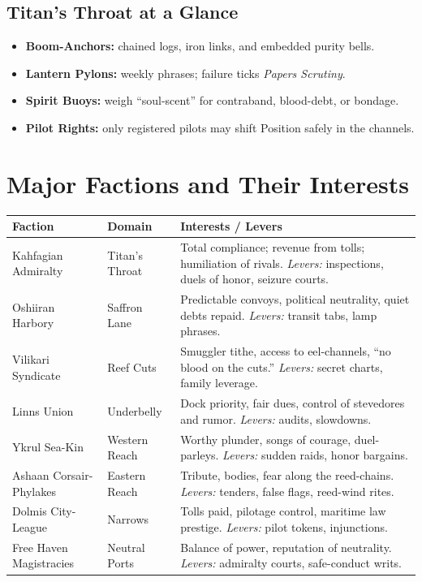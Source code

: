 \documentclass[11pt,oneside]{book}
\begin{document}
\subsection*{Titan's Throat at a Glance}
\begin{itemize}
  \item \textbf{Boom-Anchors:} chained logs, iron links, and embedded purity bells.
  \item \textbf{Lantern Pylons:} weekly phrases; failure ticks \textit{Papers Scrutiny}.
  \item \textbf{Spirit Buoys:} weigh ``soul-scent'' for contraband, blood-debt, or bondage.
  \item \textbf{Pilot Rights:} only registered pilots may shift Position safely in the channels.
\end{itemize}

\section{Major Factions and Their Interests}
\begin{tabularx}{\linewidth}{@{}p{3.3cm} p{2.6cm} X@{}}
\toprule
\textbf{Faction} & \textbf{Domain} & \textbf{Interests / Levers}\\
\midrule
Kahfagian Admiralty & Titan's Throat & Total compliance; revenue from tolls; humiliation of rivals. \textit{Levers:} inspections, duels of honor, seizure courts.\\
Oshiiran Harbory & Saffron Lane & Predictable convoys, political neutrality, quiet debts repaid. \textit{Levers:} transit tabs, lamp phrases.\\
Vilikari Syndicate & Reef Cuts & Smuggler tithe, access to eel-channels, ``no blood on the cuts.'' \textit{Levers:} secret charts, family leverage.\\
Linns Union & Underbelly & Dock priority, fair dues, control of stevedores and rumor. \textit{Levers:} audits, slowdowns.\\
Ykrul Sea-Kin & Western Reach & Worthy plunder, songs of courage, duel-parleys. \textit{Levers:} sudden raids, honor bargains.\\
Ashaan Corsair-Phylakes & Eastern Reach & Tribute, bodies, fear along the reed-chains. \textit{Levers:} tenders, false flags, reed-wind rites.\\
Dolmis City-League & Narrows & Tolls paid, pilotage control, maritime law prestige. \textit{Levers:} pilot tokens, injunctions.\\
Free Haven Magistracies & Neutral Ports & Balance of power, reputation of neutrality. \textit{Levers:} admiralty courts, safe-conduct writs.\\
\bottomrule
\end{tabularx}
\end{document}

